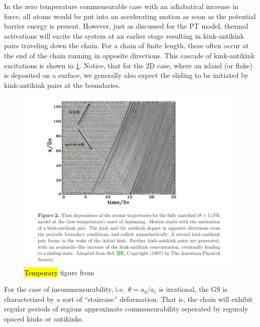 In the zero temperature commensurable case with an adiabatical increase in force, all atoms would be put into an accelerating motion as soon as the potential barrier energy is present. However, just as discussed for the \acrshort{PT} model, thermal activations will excite the system at an earlier stage resulting in kink-antikink pairs traveling down the chain. For a chain of finite length, these often occur at the end of the chain running in opposite directions. This cascade of kink-antikink excitations is shown in \cref{fig:kink_antikink}. Notice, that for the 2D case, where an island (or flake) is deposited on a surface, we generally also expect the sliding to be initiated by kink-antikink pairs at the boundaries. 

\begin{figure}[H]
  \centering
  \includegraphics[width=0.8\linewidth]{figures/theory/kink_antikink.png}
  \caption{\hl{Temporary} figure from~\cite{Manini_2016}}
  \label{fig:kink_antikink}
\end{figure}


For the case of incommensurability, i.e.\ $\theta = a_b/a_c$ is irrational, the
\acrshort{GS} is characterized by a sort of ``staircase''  deformation. That is, the chain will exhibit regular periods of regions approximate commensurability seperated by reguraly spaced kinks or antikinks.



